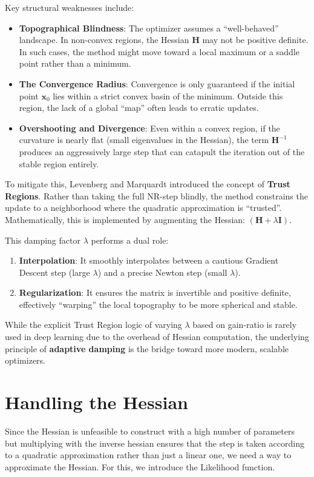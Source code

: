 Key structural weaknesses include:
\begin{itemize}
	\item \textbf{Topographical Blindness}: The optimizer assumes a \enquote{well-behaved} landscape. In non-convex regions, the Hessian $\boldsymbol{H}$ may not be positive definite. In such cases, the method might move toward a local maximum or a saddle point rather than a minimum.
	\item \textbf{The Convergence Radius}: Convergence is only guaranteed if the initial point $\boldsymbol{x}_0$ lies within a strict convex basin of the minimum. Outside this region, the lack of a global \enquote{map} often leads to erratic updates.
	\item \textbf{Overshooting and Divergence}: Even within a convex region, if the curvature is nearly flat (small eigenvalues in the Hessian), the term $\boldsymbol{H}^{-1}$ produces an aggressively large step that can catapult the iteration out of the stable region entirely.
\end{itemize}

To mitigate this, Levenberg and Marquardt introduced the concept of \textbf{Trust Regions}. Rather than taking the full NR-step blindly, the method constrains the update to a neighborhood where the quadratic approximation is \enquote{trusted}. Mathematically, this is implemented by augmenting the Hessian: $(\boldsymbol{H} + \lambda \boldsymbol{I})$. 

This damping factor $\lambda$ performs a dual role:
\begin{enumerate}
	\item \textbf{Interpolation}: It smoothly interpolates between a cautious Gradient Descent step (large $\lambda$) and a precise Newton step (small $\lambda$).
	\item \textbf{Regularization}: It ensures the matrix is invertible and positive definite, effectively \enquote{warping} the local topography to be more spherical and stable.
\end{enumerate}

While the explicit Trust Region logic of varying $\lambda$ based on gain-ratio is rarely used in deep learning due to the overhead of Hessian computation, the underlying principle of \textbf{adaptive damping} is the bridge toward more modern, scalable optimizers.
\section{Handling the Hessian}
Since the Hessian is unfeasible to construct with a high number of parameters but multiplying with the inverse hessian ensures that the step is taken according to a quadratic approximation rather than just a linear one, we need a way to approximate the Hessian. For this, we introduce the Likelihood function. 

